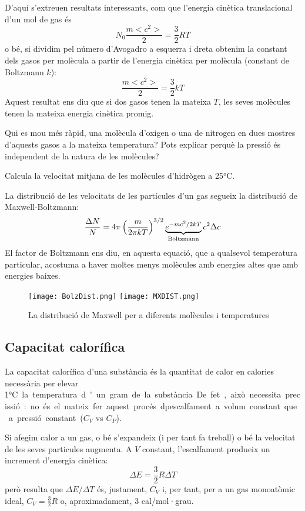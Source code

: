 D'aquí s'extreuen resultats interessants, com que l'energia cinètica translacional d'un mol de gas és \[N_0 \frac{m <c^2>}{2}=\frac{3}{2} RT\] o bé, si dividim pel número d'Avogadro a esquerra i dreta obtenim la constant dels gasos per molècula a partir de l'energia cinètica per molècula (constant de Boltzmann $k$): 
\[\frac{m <c^2>}{2}=\frac{3}{2} kT\]
Aquest resultat ens diu que si dos gasos tenen la mateixa $T$, les seves molècules tenen la mateixa energia cinètica promig. 

\begin{exr}
Qui es mou més ràpid, una molècula d'oxigen o una de nitrogen en dues mostres d'aquests gasos a la mateixa temperatura? Pots explicar perquè la pressió és independent de la natura de les molècules?
\end{exr}

\begin{exr}
Calcula la velocitat mitjana de les molècules d'hidrògen a 25\si\degreeCelsius.
\end{exr}

La distribució de les velocitats de les partícules d'un gas segueix la distribució de Maxwell-Boltzmann:
\[
\frac{\Delta N}{N}=4 \pi \left( \frac{m}{2 \pi kT}\right)^{3/2} \underbrace{e^{-mc^2/2kT}}_{\rm Boltzmann} c^2 \Delta c
\]
El factor de Boltzmann ens diu, en aquesta equació, que a qualsevol temperatura particular, acostuma a haver moltes menys molècules amb energies altes que amb energies baixes.
\begin{figure}[h]
\centering
\texttt{[image: BolzDist.png]}
\texttt{[image: MXDIST.png]}
\caption{La distribució de Maxwell per a diferents molècules i temperatures}
\label{fig:TeoriaCinetica}
\end{figure}

\subsection{Capacitat calorífica}

La capacitat calorífica d'una substància és la quantitat de calor en calories necessària per elevar 1\si\degreeCelsius la temperatura d'un gram de la substància.

De fet, això necessita precissió: no és el mateix fer aquest procés dpescalfament a volum constant que a pressió constant ($C_V$ vs $C_P$).

Si afegim calor a un gas, o bé s'expandeix (i per tant fa treball) o bé la velocitat de les seves particules augmenta.
A $V$ constant, l'escalfament produeix un increment d'energia cinètica:
\[\Delta E = \frac{3}{2} R \Delta T\]
però resulta que $\Delta E/ \Delta T$ és, justament, $C_V$ i, per tant, per a un gas monoatòmic ideal, $C_V=\frac{3}{2}R$ o, aproximadament, 3 cal/mol·grau.

